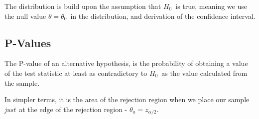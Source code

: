 \documentclass[12p,a4paper]{report}
\begin{document}
The distribution is build upon the assumption that $H_0$ is true, meaning we use the null value $\theta = \theta_0$ in the distribution, and derivation of the confidence interval.



\subsection*{P-Values}
The P-value of an alternative hypothesis, is the probability of obtaining a value of the test statistic at least as contradictory to $H_0$ as the value calculated from the sample.

In simpler terms, it is the area of the rejection region when we place our sample \textit{just} at the edge of the rejection region - $\theta_a = z_{\alpha/2}$.
\end{document}
